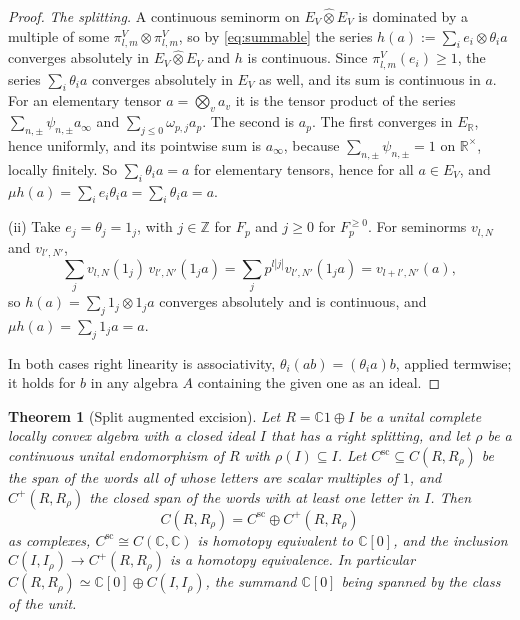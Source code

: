 \documentclass[11pt]{amsart}
\newtheorem{theorem}{Theorem}[section]
\theoremstyle{definition}
\theoremstyle{remark}
\newcommand{\C}{\mathbb C}
\newcommand{\R}{\mathbb R}
\newcommand{\Z}{\mathbb Z}
\begin{document}
\begin{proof}
\emph{The splitting.}  A continuous seminorm on $E_V\widehat\otimes E_V$ is
dominated by a multiple of some $\pi^{V}_{l,m}\otimes\pi^{V}_{l,m}$, so by
\eqref{eq:summable} the series $h(a):=\sum_ie_i\otimes\theta_ia$ converges
absolutely in $E_V\widehat\otimes E_V$ and $h$ is continuous.  Since
$\pi^{V}_{l,m}(e_i)\ge1$, the series $\sum_i\theta_ia$ converges absolutely in
$E_V$ as well, and its sum is continuous in $a$.  For an elementary tensor
$a=\bigotimes_va_v$ it is the tensor product of the series
$\sum_{n,\pm}\psi_{n,\pm}a_{\infty}$ and $\sum_{j\le0}\omega_{p,j}a_p$.  The
second is $a_p$.  The first converges in $E_{\R}$, hence uniformly, and its
pointwise sum is $a_{\infty}$, because $\sum_{n,\pm}\psi_{n,\pm}=1$ on
$\R^{\times}$, locally finitely.  So $\sum_i\theta_ia=a$ for elementary
tensors, hence for all $a\in E_V$, and
$\mu h(a)=\sum_ie_i\theta_ia=\sum_i\theta_ia=a$.

(ii) Take $e_j=\theta_j=1_j$, with $j\in\Z$ for $F_p$ and $j\ge0$ for
$F_p^{\ge0}$.  For seminorms $v_{l,N}$ and $v_{l',N'}$,
\[
\sum_jv_{l,N}(1_j)\,v_{l',N'}(1_ja)=\sum_jp^{l|j|}v_{l',N'}(1_ja)=v_{l+l',N'}(a),
\]
so $h(a)=\sum_j1_j\otimes1_ja$ converges absolutely and is continuous, and
$\mu h(a)=\sum_j1_ja=a$.

In both cases right linearity is associativity, $\theta_i(ab)=(\theta_ia)b$,
applied termwise; it holds for $b$ in any algebra $A$ containing the given one
as an ideal.
\end{proof}

\begin{theorem}[Split augmented excision]\label{thm:B2}
Let $R=\C1\oplus I$ be a unital complete locally convex algebra with a closed
ideal $I$ that has a right splitting, and let $\rho$ be a continuous unital
endomorphism of $R$ with $\rho(I)\subseteq I$.  Let $C^{\mathrm{sc}}\subseteq
C(R,R_{\rho})$ be the span of the words all of whose letters are scalar
multiples of $1$, and $C^{+}(R,R_{\rho})$ the closed span of the words with
at least one letter in $I$.  Then
\[
C(R,R_{\rho})=C^{\mathrm{sc}}\oplus C^{+}(R,R_{\rho})
\]
as complexes, $C^{\mathrm{sc}}\cong C(\C,\C)$ is homotopy equivalent to
$\C[0]$, and the inclusion $C(I,I_{\rho})\to C^{+}(R,R_{\rho})$ is a
homotopy equivalence.  In particular
$C(R,R_{\rho})\simeq\C[0]\oplus C(I,I_{\rho})$, the summand $\C[0]$ being
spanned by the class of the unit.
\end{theorem}
\end{document}
